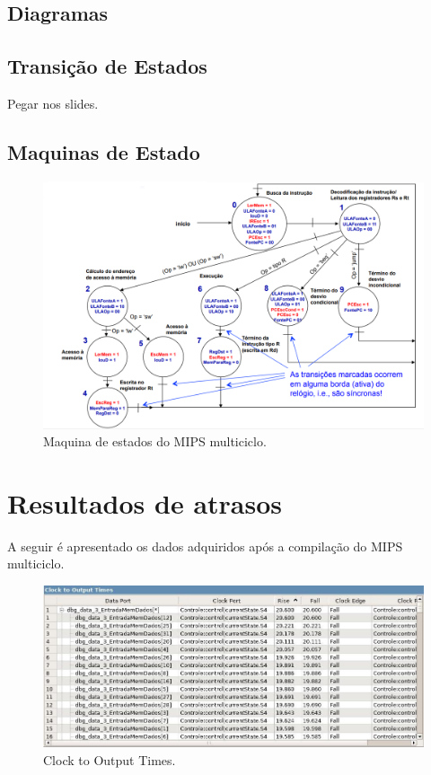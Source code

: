 \documentclass{article}
\begin{document}
        \subsection{Diagramas}

        \subsection{Transição de Estados}

        Pegar nos slides.

        \subsection{Maquinas de Estado}

        \begin{figure}[H]
            \centering
            \includegraphics[scale=1.5]{maquina_estados.png}
            \caption{Maquina de estados do MIPS multiciclo.}
            \label{figura:maquina}
        \end{figure}

        \section{Resultados de atrasos}

        A seguir é apresentado os dados adquiridos após a compilação do MIPS
        multiciclo.

        \begin{figure}[H]
            \centering
            \includegraphics[width=\textwidth]{clock_to_output_times.jpg}
            \caption{Clock to Output Times.}
            \label{figura:mips}
        \end{figure}
\end{document}
